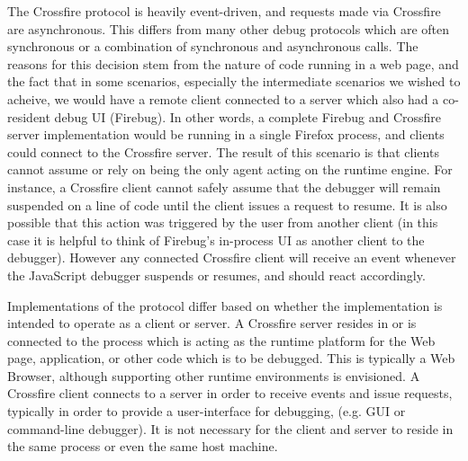 The Crossfire protocol is heavily event-driven, and requests made via Crossfire
are asynchronous. This differs from many other debug protocols which are often
synchronous or a combination of synchronous and asynchronous calls.  The reasons
for this decision stem from the nature of code running in a web page, and the
fact that in some scenarios, especially the intermediate scenarios we wished to
acheive, we would have a remote client connected to a server which also had a
co-resident debug UI (Firebug). In other words, a complete Firebug and Crossfire
server implementation would be running in a single Firefox process, and clients
could connect to the Crossfire server. The result of this scenario is that
clients cannot assume or rely on being the only agent acting on the runtime
engine. For instance, a Crossfire client cannot safely assume that the debugger
will remain suspended on a line of code until the client issues a request to
resume. It is also possible that this action was triggered by the user from
another client (in this case it is helpful to think of Firebug's in-process UI
as another client to the debugger). However any connected Crossfire client will
receive an event whenever the JavaScript debugger suspends or resumes, and
should react accordingly.

Implementations of the protocol differ based on whether the implementation is
intended to operate as a client or server. A Crossfire server resides in or is
connected to the process which is acting as the runtime platform for the Web
page, application, or other code which is to be debugged. This is typically a
Web Browser, although supporting other runtime environments is envisioned. A
Crossfire client connects to a server in order to receive events and issue
requests, typically in order to provide a user-interface
for debugging, (e.g. GUI or command-line debugger). It is not necessary for the
client and server to reside in the same process or even the same host machine.



